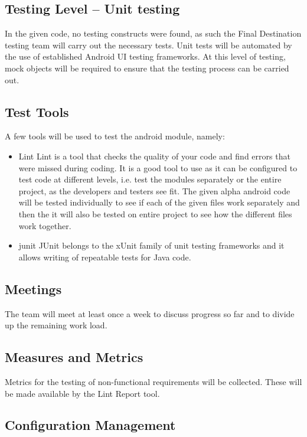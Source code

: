 \subsection{Testing Level -- Unit testing}
In the given code, no testing constructs were found, as such the Final Destination testing team will carry out the necessary tests.
Unit tests will be automated by the use of established Android UI testing frameworks. At this level of testing, mock objects will be required to ensure that the testing process can be carried out.

\subsection{Test Tools}
A few tools will be used to test the android module, namely: \\
\renewcommand{\labelenumi}{\Roman{enumi}}
\begin{itemize}
	\item Lint
	  Lint is a tool that checks the quality of your code and find errors that were missed during coding. It is a good tool to use as it can be configured to test code at different levels, i.e. test the modules separately or the entire project, as the developers and testers see fit. The given alpha android code will be tested individually to see if each of the given files work separately and then the it will also be tested on entire project to see how the different files work together.
	\item junit
	  JUnit belongs to the xUnit family of unit testing frameworks and it allows writing of repeatable tests for Java code.
\end{itemize}

\subsection{Meetings}
The team will meet at least once a week to discuss progress so far and to divide up the remaining work load.

\subsection{Measures and Metrics}
Metrics for the testing of non-functional requirements will be collected. These will be made available by the Lint Report tool.

\subsection{Configuration Management}


